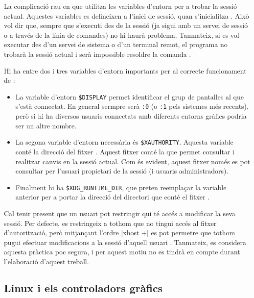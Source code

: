 La complicació rau en que  utilitza les variables d'entorn per a
trobar la sessió actual. Aquestes variables es defineixen a l'inici de sessió,
quan s'inicialitza . Això vol dir que, sempre que s'executi
 des de la sessió (ja sigui amb un servei de sessió o a través de
la línia de comandes) no hi haurà problema.
Tanmateix, si es vol executar  des d'un servei de sistema o d'un
terminal remot, el programa no trobarà la sessió actual i serà impossible
resoldre la comanda \cite{ArchWiki}.

Hi ha entre dos i tres variables d'entorn importants per al correcte funcionament
de  \cite{XrandrVars}:

\begin{itemize}
    \item La variable d'entorn \verb|$DISPLAY| permet identificar el grup de
    pantalles al que s'està connectat. En general sermpre serà \verb|:0| (o 
    \verb|:1| pels sistemes més recents), però si hi ha diversos usuaris
    connectats amb diferents entorns gràfics podria ser un altre nombre.
    \item La segona variable d'entorn necessària és \verb|$XAUTHORITY|. Aquesta
    variable conté la direcció del fitxer . Aquest fitxer
    conté la  que permet consultar i realitzar canvis en la sessió
    actual. Com és evident, aquest fitxer només es pot consultar per l'usuari
    propietari de la sessió (i usuaris administradors).
    \item Finalment hi ha \verb|$XDG_RUNTIME_DIR|, que preten reemplaçar la
    variable anterior per a portar la direcció del directori que conté el fitxer
    .
\end{itemize}

Cal tenir present que un usuari pot restringir qui té accés a modificar la
seva sessió. Per defecte, es restringeix a tothom que no tingui accés al
fitxer d'autorització, però mitjançant l'ordre \ord|xhost +| es pot permetre
que tothom pugui efectuar modificacions a la sessió d'aquell usuari \cite{Xhost}.
Tanmateix, es considera aquesta pràctica poc segura, i per aquest motiu no es
tindrà en compte durant l'elaboració d'aquest treball.

\subsection{Linux i els controladors gràfics}

